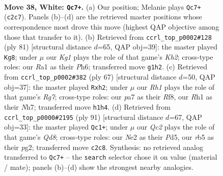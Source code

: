 \documentclass[11pt]{article}
\begin{document}
\clearpage

\begin{figure}[p]\centering
\begin{subfigure}{0.46\textwidth}\centering
\resizebox{\linewidth}{!}{%
\newchessgame
\chessboard[
  setfen={5n2/pp4kp/7p/1r6/3P4/5q2/2Q1N3/R5KR w - - 0 38},
  showmover=false,
  pgfstyle=straightmove, color=movearrow, markmove={c2-c7}
]}
\caption{}
\end{subfigure}\hfill
\begin{subfigure}{0.46\textwidth}\centering
\resizebox{\linewidth}{!}{%
\newchessgame
\chessboard[
  setfen={8/6pk/4qn1p/8/2PQ4/4r1PP/3N1RK1/8 b - - 4 41},
  showmover=false,
  pgfstyle=straightmove, color=movearrow, markmove={h7-g8}
]}
\caption{}
\end{subfigure}
\\[4pt]
\begin{subfigure}{0.46\textwidth}\centering
\resizebox{\linewidth}{!}{%
\newchessgame
\chessboard[
  setfen={5r1k/2q4n/p2N1p2/8/4Q3/8/PPP1N1rP/1K1R4 b - - 3 34},
  showmover=false,
  pgfstyle=straightmove, color=movearrow, markmove={g2-h2}
]}
\caption{}
\end{subfigure}\hfill
\begin{subfigure}{0.46\textwidth}\centering
\resizebox{\linewidth}{!}{%
\newchessgame
\chessboard[
  setfen={6R1/kr6/2Q1p2p/3p4/1P6/K1P5/P5P1/3q4 b - - 6 46},
  showmover=false,
  pgfstyle=straightmove, color=movearrow, markmove={d1-c1}
]}
\caption{}
\end{subfigure}
\caption{\textbf{Move 38, White: \texttt{Qc7+}.} (a) Our position; Melanie plays \texttt{Qc7+} (\texttt{c2c7}). Panels (b)--(d) are the retrieved master positions whose correspondence most drove this move (highest QAP objective among those that transfer to it). (b) Retrieved from \texttt{ccrl\_top\_p0002\#128} (ply 81) [structural distance $d$=65, QAP obj=39]: the master played \texttt{Kg8}; under $\mu$ our \emph{Kg1} plays the role of that game's \emph{Kh2}; cross-type roles: our \emph{R}a1 as their \emph{P}h6; transferred move \texttt{g1h2}. (c) Retrieved from \texttt{ccrl\_top\_p0002\#382} (ply 67) [structural distance $d$=50, QAP obj=37]: the master played \texttt{Rxh2}; under $\mu$ our \emph{Rh1} plays the role of that game's \emph{Rg7}; cross-type roles: our \emph{p}a7 as their \emph{R}f8, our \emph{R}h1 as their \emph{N}h7; transferred move \texttt{h1h4}. (d) Retrieved from \texttt{ccrl\_top\_p0000\#2195} (ply 91) [structural distance $d$=67, QAP obj=33]: the master played \texttt{Qc1+}; under $\mu$ our \emph{Qc2} plays the role of that game's \emph{Qd8}; cross-type roles: our \emph{N}e2 as their \emph{P}d5, our \emph{r}b5 as their \emph{p}g2; transferred move \texttt{c2c8}. Synthesis: no retrieved analog transferred to \texttt{Qc7+} -- the \texttt{search} selector chose it on value (material / mate); panels (b)--(d) show the strongest nearby analogies.}
\label{fig:thought-m74}
\end{figure}
\end{document}
